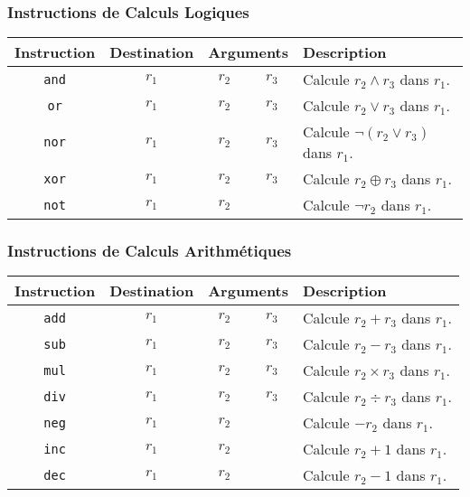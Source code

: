 \documentclass[french, 12pt]{article}
\begin{document}
\subsubsection*{Instructions de Calculs Logiques}
\noindent
\begin{tabularx}{\textwidth}{cccc X}
      \toprule
      Instruction  & Destination & \multicolumn{2}{c}{Arguments} & Description                                             \\
      \midrule
      \texttt{and} & $r_1$       & $r_2$                         & $r_3$       & Calcule $r_2 \land r_3$ dans $r_1$.       \\
      \texttt{or}  & $r_1$       & $r_2$                         & $r_3$       & Calcule $r_2 \lor r_3$ dans $r_1$.        \\
      \texttt{nor} & $r_1$       & $r_2$                         & $r_3$       & Calcule $\neg (r_2 \lor r_3)$ dans $r_1$. \\
      \texttt{xor} & $r_1$       & $r_2$                         & $r_3$       & Calcule $r_2 \oplus r_3$ dans $r_1$.      \\
      \texttt{not} & $r_1$       & $r_2$                         &             & Calcule $\neg r_2$ dans $r_1$.            \\
      \bottomrule
\end{tabularx}

\subsubsection*{Instructions de Calculs Arithmétiques}

\noindent
\begin{tabularx}{\textwidth}{cccc X}
      \toprule
      Instruction  & Destination & \multicolumn{2}{c}{Arguments} & Description                                        \\
      \midrule
      \texttt{add} & $r_1$       & $r_2$                         & $r_3$       & Calcule $r_2 + r_3$ dans $r_1$.      \\
      \texttt{sub} & $r_1$       & $r_2$                         & $r_3$       & Calcule $r_2 - r_3$ dans $r_1$.      \\
      \texttt{mul} & $r_1$       & $r_2$                         & $r_3$       & Calcule $r_2 \times r_3$ dans $r_1$. \\
      \texttt{div} & $r_1$       & $r_2$                         & $r_3$       & Calcule $r_2 \div r_3$ dans $r_1$.   \\
      \texttt{neg} & $r_1$       & $r_2$                         &             & Calcule $-r_2$ dans $r_1$.           \\
      \texttt{inc} & $r_1$       & $r_2$                         &             & Calcule $r_2 + 1$ dans $r_1$.        \\
      \texttt{dec} & $r_1$       & $r_2$                         &             & Calcule $r_2 - 1$ dans $r_1$.        \\
      \bottomrule
\end{tabularx}
\end{document}
